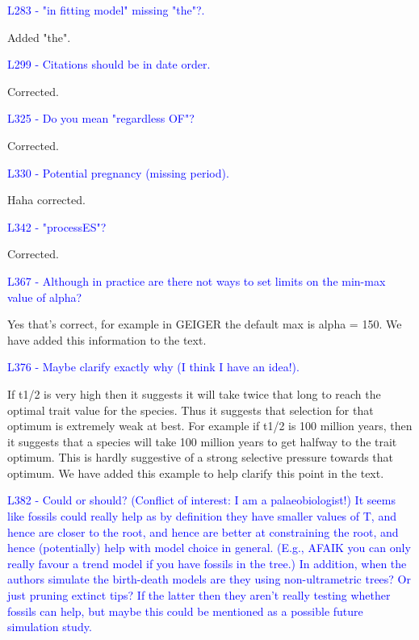 \documentclass[12pt]{letter}
\begin{document}
\begin{letter}{}

\textcolor{blue}{L283 - "in fitting model" missing "the"?.}

Added "the".

\textcolor{blue}{L299 - Citations should be in date order.}

Corrected.

\textcolor{blue}{L325 - Do you mean "regardless OF"?}

Corrected.

\textcolor{blue}{L330 - Potential pregnancy (missing period).}

Haha corrected.

\textcolor{blue}{L342 - "processES"?}

Corrected.

\textcolor{blue}{L367 - Although in practice are there not ways to set limits on the min-max value of alpha?}

Yes that's correct, for example in GEIGER the default max is alpha = 150. We have added this information to the text. 

\textcolor{blue}{L376 - Maybe clarify exactly why (I think I have an idea!).}

If t1/2 is very high then it suggests it will take twice that long to reach the optimal trait value for the species. Thus it suggests that selection for that optimum is extremely weak at best. For example if t1/2 is 100 million years, then it suggests that a species will take 100 million years to get halfway to the trait optimum. This is hardly suggestive of a strong selective pressure towards that optimum. We have added this example to help clarify this point in the text.

\textcolor{blue}{L382 - Could or should? (Conflict of interest: I am a palaeobiologist!) It seems like fossils could really help as by definition they have smaller values of T, and hence are closer to the root, and hence are better at constraining the root, and hence (potentially) help with model choice in general. (E.g., AFAIK you can only really favour a trend model if you have fossils in the tree.) In addition, when the authors simulate the birth-death models are they using non-ultrametric trees? Or just pruning extinct tips? If the latter then they aren't really testing whether fossils can help, but maybe this could be mentioned as a possible future simulation study.}


\end{letter}
\end{document}
